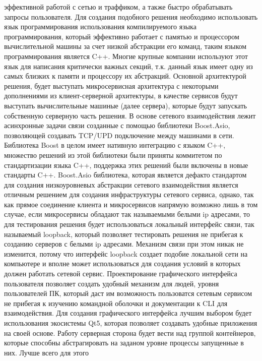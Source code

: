 \documentclass[a4paper, 14pt]{extreport}
\begin{document}
 эффективной работой с сетью и траффиком, а также быстро обрабатывать запросы пользователя. Для создания подобного решения необходимо использовать язык
 программирования 
 использования компилируемого языка программирования\cite{compLangArt}\cite{compLangBook}, который эффективно работает с памятью и
 процессором вычислительной машины за счет 
 низкой абстракции его команд, таким языком программирования является C++\cite{cppBook}\cite{cppArt1}. Многие крупные компании используют этот язык для написания 
 критически важных секций, т.к. данный язык имеет одну из самых близких к памяти и процессору их абстракций. Основной архитектурой 
 решения, будет выступать микросервисная архитектура с некоторыми дополнениями из клиент-серверной архитектуры, в качестве сервисов 
 будут выступать вычислительные машиные (далее сервера), которые будут запускать собственную серверную часть решения. В основе сетевого
 взаимодействия лежит асинхронные задачи связи созданные с помощью библиотеки Boost.Asio, позволяющей создавать TCP/UPD подключение между
 машинами в сети. Библиотека Boost в целом имеет нативную интеграцию с языком C++, множество решений из этой библиотеки были приняты 
 коммитетом по стандартизации языка C++, поддержка этих решений были включены в новые стандарты C++. Boost.Asio библиотека, которая 
 является дефакто стандартом для создания низкоуровневых абстракции сетевого взаимодействия является отличным решением для создания 
 инфраструктуры сетевого сервиса, однако, так как прямое соединение клиента и микросервисов напрямую возможно лишь в том случае, если
 микросервисы обладают так называемыми белыми ip адресами, то для тестирования решения будет использоваться локальный
 интерфейс связи, так называемый loopback, который позволяет тестировать решения не прибегая к созданию серверов с белыми ip адресами.
 Механизм связи при этом никак не изменится, потому что интерфейс loopback создает подобие локальной сети на компьютере и вполне может
 использоваться для создания условий в которых должен работать сетевой сервис. Проектирование графического интерфейса пользователя 
 позволяет создать удобный механизм для людей, уровня пользователей ПК, который даст им возможность пользоватся сетевым сервисом не 
 прибегая к изучению командной оболочки и документации к CLI для взаимодействия. Для создания графического интерфейса лучшим выбором 
 будет использования экосистемы Qt5, которая позволяет создавать удобные приложения на своей основе. Работу серверная сторона будет 
 вести над группой контейнеров, которые способны абстрагировать на заданом уровне процессы запущенные в них. Лучше всего для этого 
\end{document}
